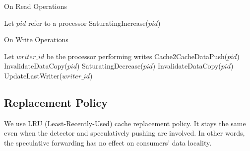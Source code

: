\documentclass[11pt,conference]{IEEEtran}
\begin{document}
\begin{algorithm}
\caption{On Read Operations}
\label{read_operations}
\begin{algorithmic}[1]
\State Let $pid$ refer to a processor
    \State SaturatingIncrease($pid$) 
\EndFor
\end{algorithmic}
\end{algorithm}
\FloatBarrier

\begin{algorithm}
\caption{On Write Operations}
\label{write_operations}
\begin{algorithmic}[1]
\State Let $writer\_id$ be the processor performing writes
     
            \State Cache2CacheDataPush($pid$) 
        \Else
            \State InvalidateDataCopy($pid$) 
        \EndIf
    \EndFor
\Else
     
        \State SaturatingDecrease($pid$) 
        \State InvalidateDataCopy($pid$) 
    \EndFor
    \State UpdateLastWriter($writer\_id$)
\EndIf
\end{algorithmic}
\end{algorithm}
\FloatBarrier




\subsection{Replacement Policy}
We use LRU (Least-Recently-Used) cache replacement policy. It stays the same even when the detector and speculatively pushing are involved.
In other words, the speculative forwarding has no effect on consumers' data locality.
\end{document}
